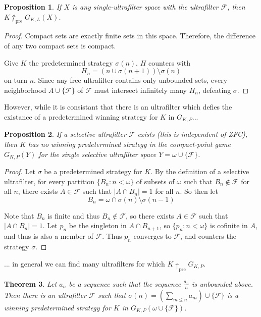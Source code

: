 \documentclass[11pt]{article}
\theoremstyle{plain}
\newtheorem{theorem}{Theorem}
\newtheorem{proposition}[theorem]{Proposition}
\theoremstyle{definition}
\theoremstyle{remark}
\newcommand{\prewin}{\uparrow_{\text{pre}}}
\begin{document}
\begin{proposition}
If $X$ is any single-ultrafilter space with the ultrafilter $\mathcal{F}$, then $K\not\prewin G_{K,L}(X)$.
\end{proposition}

\begin{proof}
Compact sets are exactly finite sets in this space. Therefore, the difference of any two compact sets is compact.

Give $K$ the predetermined strategy $\sigma(n)$. $H$ counters with \[H_n=(n\cup\sigma(n+1))\setminus\sigma(n)\] on turn $n$. Since any free ultrafilter contains only unbounded sets, every neighborhood $A\cup\{\mathcal{F}\}$ of $\mathcal{F}$ must intersect infinitely many $H_n$, defeating $\sigma$.
\end{proof}

However, while it is consistant that there is an ultrafilter which defies the existance of a predetermined winning strategy for $K$ in $G_{K,P}$...

\begin{proposition} 
If a selective ultrafilter $\mathcal{F}$ exists (this is independent of ZFC), then $K$ has no winning predetermined strategy in the compact-point game $G_{K,P}(Y)$ for the single selective ultrafilter space $Y=\omega \cup \{\mathcal{F}\}$.
\end{proposition}

\begin{proof}
Let $\sigma$ be a predetermined strategy for $K$. By the definition of a selective ultrafilter, for every partition $\{B_n : n < \omega\}$ of subsets of $\omega$ such that $B_n \not\in \mathcal{F}$ for all $n$, there exists $A \in \mathcal{F}$ such that $|A \cap B_n|=1$ for all $n$. So then let \[B_n = \omega \cap \sigma(n) \setminus \sigma(n-1)\]
  
Note that $B_n$ is finite and thus $B_n \not\in \mathcal{F}$, so there exists $A\in \mathcal{F}$ such that $|A \cap B_n|=1$. Let $p_n$ be the singleton in $A \cap B_{n+1}$, so $\{p_n : n < \omega\}$ is cofinite in $A$, and thus is also a member of $\mathcal{F}$. Thus $p_n$ converges to $\mathcal{F}$, and counters the strategy $\sigma$.
\end{proof}

... in general we can find many ultrafilters for which $K\prewin G_{K,P}$.

\begin{theorem}
Let $a_n$ be a sequence such that the sequence $\frac{a_n}{n}$ is unbounded above. Then there is an ultrafilter $\mathcal{F}$ such that $\sigma(n)=(\sum_{m\leq n} a_m )\cup \{\mathcal{F}\}$ is a winning predetermined strategy for $K$ in $G_{K,P}(\omega\cup\{\mathcal{F}\})$.
\end{theorem}
\end{document}
